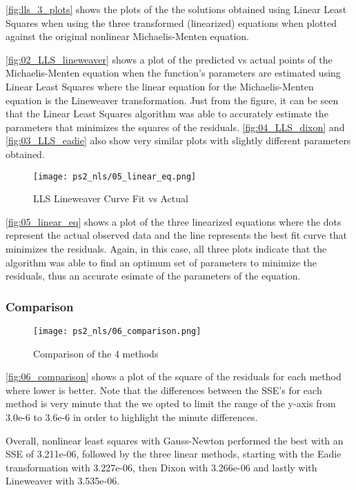 \documentclass{article} %
\theoremstyle{definition}
\theoremstyle{remark}
\theoremstyle{plain}
\begin{document}
\autoref{fig:lls_3_plots} shows the plots of the the solutions obtained using Linear Least Squares when using the three transformed (linearized) equations when plotted against the original nonlinear Michaelis-Menten equation.

\autoref{fig:02_LLS_lineweaver} shows a plot of the predicted vs actual points of the Michaelis-Menten equation when the function's parameters are estimated using Linear Least Squares where the linear equation for the Michaelis-Menten equation is the Lineweaver transformation. Just from the figure, it can be seen that the Linear Least Squares algorithm was able to accurately estimate the parameters that minimizes the squares of the residuals. \autoref{fig:04_LLS_dixon}
 and \autoref{fig:03_LLS_eadie} also show very similar plots with slightly different parameters obtained.


\begin{figure}[h!]
    \centering
    \texttt{[image: ps2\_nls/05\_linear\_eq.png]}
    \caption{LLS Lineweaver Curve Fit vs Actual}
    \label{fig:05_linear_eq}
\end{figure}

\autoref{fig:05_linear_eq} shows a plot of the three linearized equations where the dots represent the actual observed data and the line represents the best fit curve that minimizes the residuals. Again, in this case, all three plots indicate that the algorithm was able to find an optimum set of parameters to minimize the residuals, thus an accurate esimate of the parameters of the equation.


\subsubsection{Comparison}
\begin{figure}[h!]
    \centering
    \texttt{[image: ps2\_nls/06\_comparison.png]}
    \caption{Comparison of the 4 methods}
    \label{fig:06_comparison}
\end{figure}

\autoref{fig:06_comparison} shows a plot of the square of the residuals for each method where lower is better. Note that the differences between the SSE's for each method is very minute that the we opted to limit the range of the y-axis from 3.0e-6 to 3.6e-6 in order to highlight the minute differences. 

Overall, nonlinear least squares with Gauss-Newton performed the best with an SSE of 3.211e-06, followed by the three linear methods, starting with the Eadie transformation with 3.227e-06, then Dixon with 3.266e-06 and lastly with Lineweaver with 3.535e-06.
\end{document}
